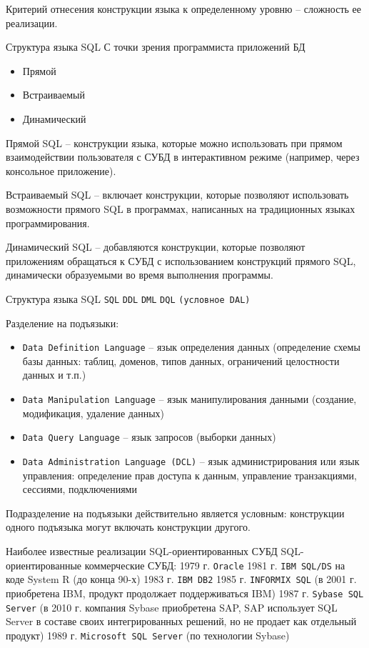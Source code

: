 \documentclass[a4paper,12pt]{article}
\begin{document}
Критерий отнесения конструкции языка к определенному уровню – сложность ее реализации.

Структура языка SQL  
С точки зрения программиста приложений БД  
\begin{itemize}
\item Прямой
\item Встраиваемый
\item Динамический
\end{itemize}

Прямой SQL – конструкции языка, которые можно использовать при прямом взаимодействии пользователя с СУБД в интерактивном режиме (например, через консольное приложение).

Встраиваемый SQL – включает конструкции, которые позволяют использовать возможности прямого SQL в программах, написанных на традиционных языках программирования.

Динамический SQL – добавляются конструкции, которые позволяют приложениям обращаться к СУБД с использованием конструкций прямого SQL, динамически образуемыми во время выполнения программы.

Структура языка SQL  
\texttt{SQL}  
\texttt{DDL}  
\texttt{DML}  
\texttt{DQL}  
\texttt{(условное DAL)}

Разделение на подъязыки:  
\begin{itemize}
\item \texttt{Data Definition Language} – язык определения данных (определение схемы базы данных: таблиц, доменов, типов данных, ограничений целостности данных и т.п.)
\item \texttt{Data Manipulation Language} – язык манипулирования данными (создание, модификация, удаление данных)
\item \texttt{Data Query Language} – язык запросов (выборки данных)
\item \texttt{Data Administration Language (DCL)} – язык администрирования или язык управления: определение прав доступа к данным, управление транзакциями, сессиями, подключениями
\end{itemize}

Подразделение на подъязыки действительно является условным: конструкции одного подъязыка могут включать конструкции другого.

Наиболее известные реализации SQL-ориентированных СУБД  
SQL-ориентированные коммерческие СУБД:  
1979 г. \texttt{Oracle}  
1981 г. \texttt{IBM SQL/DS} на коде System R (до конца 90-х)  
1983 г. \texttt{IBM DB2}  
1985 г. \texttt{INFORMIX SQL} (в 2001 г. приобретена IBM, продукт продолжает поддерживаться IBM)  
1987 г. \texttt{Sybase SQL Server} (в 2010 г. компания Sybase приобретена SAP, SAP использует SQL Server в составе своих интегрированных решений, но не продает как отдельный продукт)  
1989 г. \texttt{Microsoft SQL Server} (по технологии Sybase)
\end{document}
